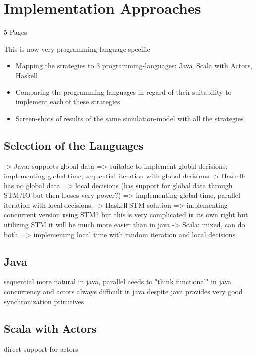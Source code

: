 \section{Implementation Approaches}
5 Pages

This is now very programming-language specific

\begin{itemize}
	\item Mapping the strategies to 3 programming-languages: Java, Scala with Actors, Haskell
	\item Comparing the programming languages in regard of their suitability to implement each of these strategies
	\item Screen-shots of results of the same simulation-model with all the strategies
\end{itemize}

\subsection{Selection of the Languages}
-> Java: supports global data => suitable to implement global decisions: implementing global-time, sequential iteration with global decisions
	-> Haskell: has no global data => local decisions (has support for global data through STM/IO but then looses very power?) => implementing global-time, parallel iteration with local-decisions. 
		-> Haskell STM solution => implementing concurrent version using STM? but this is very complicated in its own right but utilizing STM it will be much more easier than in java
	-> Scala: mixed, can do both => implementing local time with random iteration and local decisions


\subsection{Java}
sequential more natural in java,
parallel needs to "think functional" in java
concurrency and actors always difficult in java despite java provides very good synchronization primitives

\subsection{Scala with Actors}
direct support for actors

